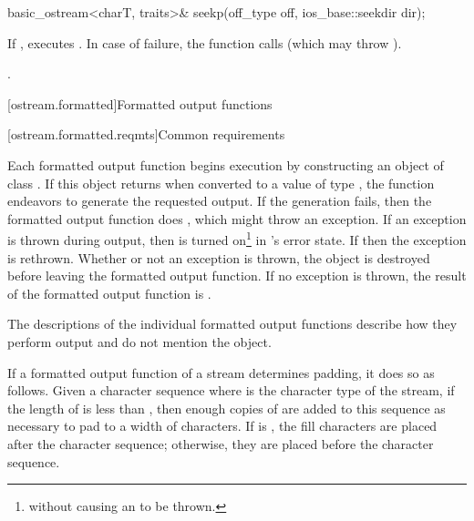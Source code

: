 %
%
\begin{itemdecl}
basic_ostream<charT, traits>& seekp(off_type off, ios_base::seekdir dir);
\end{itemdecl}

\begin{itemdescr}
\pnum
\effects
If
,
executes
.
In case of failure, the function calls 
(which may throw ).

\pnum
\returns
{}.
\end{itemdescr}

[ostream.formatted]{Formatted output functions}

[ostream.formatted.reqmts]{Common requirements}

\pnum
Each formatted output function begins execution by constructing an object of class
.
If this object returns
when converted to a value of type
,
the function endeavors
to generate the requested output.
If the generation fails, then the formatted output function does
,
which might throw an exception.
If an exception is thrown during output, then
is turned on\footnote{without causing an
to be thrown.}
in
's
error state.
If
then the exception is rethrown.
Whether or not an exception is thrown, the
object is destroyed before leaving the formatted output function.
If no exception is thrown, the result of the formatted output function
is
.

\pnum
The descriptions of the individual formatted output functions
describe how they perform
output and do not mention the
object.

\pnum
If a formatted output function of a stream  determines
padding, it does so as
follows. Given a  character sequence  where
 is the character type of the stream, if
the length of  is less than , then enough copies of
 are added to this sequence as necessary to pad to a
width of  characters. If
 is
, the fill characters are placed
after the character sequence; otherwise, they are placed before the
character sequence.

